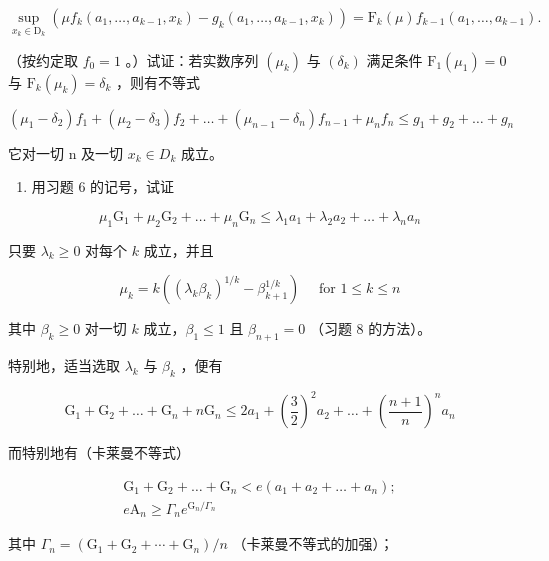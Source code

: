\[
\sup _ {x _ {k} \in \mathrm{D} _ {k}} \left(\mu f _ {k} (a _ {1}, \dots , a _ {k - 1}, x _ {k}) - g _ {k} (a _ {1}, \dots , a _ {k - 1}, x _ {k})\right) = \mathrm{F} _ {k} (\mu) f _ {k - 1} (a _ {1}, \dots , a _ {k - 1}).
\]

（按约定取 \(f_0 = 1\) 。）试证：若实数序列 \((\mu_k)\) 与 \((\delta_k)\) 满足条件 \(\mathrm{F}_1(\mu_1) = 0\) 与 \(\mathrm{F}_k(\mu_k) = \delta_k\) ，则有不等式

\[
\left(\mu_ {1} - \delta_ {2}\right) f _ {1} + \left(\mu_ {2} - \delta_ {3}\right) f _ {2} + \dots + \left(\mu_ {n - 1} - \delta_ {n}\right) f _ {n - 1} + \mu_ {n} f _ {n} \leqslant g _ {1} + g _ {2} + \dots + g _ {n}
\]

它对一切 n 及一切 \(x_{k} \in D_{k}\) 成立。

\begin{enumerate}
\def\labelenumi{\arabic{enumi})}
\setcounter{enumi}{8}
\tightlist
\item
  用习题 6 的记号，试证
\end{enumerate}

\[
\mu_ {1} \mathrm{G} _ {1} + \mu_ {2} \mathrm{G} _ {2} + \dots + \mu_ {n} \mathrm{G} _ {n} \leqslant \lambda_ {1} a _ {1} + \lambda_ {2} a _ {2} + \dots + \lambda_ {n} a _ {n}
\]

只要 \(\lambda_{k}\geqslant 0\) 对每个 \(k\) 成立，并且

\[
\mu_ {k} = k \left(\left(\lambda_ {k} \beta_ {k}\right) ^ {1 / k} - \beta_ {k + 1} ^ {1 / k}\right) \quad \text { for } 1 \leqslant k \leqslant n
\]

其中 \(\beta_{k}\geqslant 0\) 对一切 \(k\) 成立，\(\beta_{1}\leqslant 1\) 且 \(\beta_{n + 1} = 0\) （习题 8 的方法）。

特别地，适当选取 \(\lambda_{k}\) 与 \(\beta_{k}\) ，便有

\[
\mathrm{G} _ {1} + \mathrm{G} _ {2} + \dots + \mathrm{G} _ {n} + n \mathrm{G} _ {n} \leqslant 2 a _ {1} + \left(\frac {3}{2}\right) ^ {2} a _ {2} + \dots + \left(\frac {n + 1}{n}\right) ^ {n} a _ {n}
\]

而特别地有（卡莱曼不等式）

\[
\begin{array}{c} \mathrm{G} _ {1} + \mathrm{G} _ {2} + \dots + \mathrm{G} _ {n} <   e (a _ {1} + a _ {2} + \dots + a _ {n}); \\ e \mathrm{A} _ {n} \geqslant \Gamma_ {n} e ^ {\mathrm{G} _ {n} / \Gamma_ {n}} \end{array}
\]

其中 \(\Gamma_{n}=(\mathrm{G}_{1}+\mathrm{G}_{2}+\cdots+\mathrm{G}_{n})/n\) （卡莱曼不等式的加强）；

